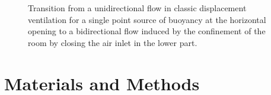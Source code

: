 \documentclass[preprint,12pt]{elsarticle}
\begin{document}
\begin{figure}
\caption{Transition from a unidirectional flow in classic displacement
  ventilation for a single point source of buoyancy at the horizontal opening to a bidirectional flow induced by the confinement of the room by closing the air inlet in the lower part.}
\label{fig:bidi2mono}
\end{figure}

\section{Materials and Methods}
\label{sec:orgda34844}
\end{document}
